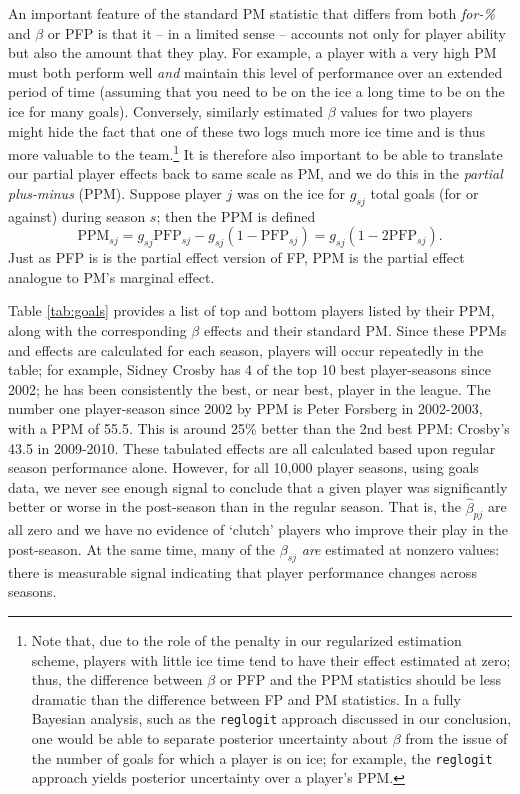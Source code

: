 An important feature of the standard PM statistic that differs from both
\textit{for-\%} and $\beta$ or PFP is that it -- in a limited sense -- accounts
not only for player ability but also the amount that they play.  For example,
a player with a very high PM must both perform well \textit{and} maintain this
level of performance over an extended period of time (assuming that you need
to be on the ice a long time to be on the ice for many goals).  Conversely,
similarly estimated $\beta$ values for two players might hide the fact that one
of these two logs much more ice time and is thus more valuable to the
team.\footnote{Note that, due to the role of the penalty in our regularized
estimation scheme,  players with little ice time tend to have their effect
estimated at zero; thus, the difference between $\beta$ or PFP and the PPM
statistics should be less dramatic than the difference between FP and PM
statistics. In a fully Bayesian analysis, such as the {\tt reglogit} approach
discussed in our conclusion, one would be able to separate posterior
uncertainty about $\beta$ from the issue of the number of goals for which a
player is on ice; for example, the {\tt reglogit} approach yields posterior
uncertainty over a player's PPM.}  It is therefore also important to be able to
translate our partial player effects back to same scale as PM, and we do this
in the {\em partial plus-minus} (PPM). Suppose player $j$ was on the ice for
$g_{sj}$ total goals (for or against) during season $s$; then the PPM is
defined \begin{equation}\label{eq:ppm}  \text{PPM}_{sj} =
g_{sj}\text{PFP}_{sj} - g_{sj}(1-\text{PFP}_{sj}) = g_{sj}(1 -
2\text{PFP}_{sj}).  \end{equation}   Just as PFP is is the partial effect
version of FP, PPM is the partial effect analogue to PM's marginal effect.

Table \ref{tab:goals} provides a list of top and bottom players listed by
their PPM, along with the corresponding $\beta$ effects and their standard PM.
Since these PPMs and effects are calculated for each season, players will
occur repeatedly in the table; for example, Sidney Crosby has 4 of the top 10
best player-seasons since 2002; he has been consistently the best, or near
best, player in the league.  The number one player-season since 2002 by PPM is
Peter Forsberg in 2002-2003, with a PPM of 55.5.  This is around 25\% better
than the 2nd best PPM: Crosby's 43.5 in 2009-2010.  These tabulated effects
are all calculated based upon regular season performance alone.  However,
 for all 10,000 player seasons, using goals data, we never see
enough signal to conclude that a given player was significantly better or
worse in the post-season than in the regular season.  That is, the $\hat
\beta_{pj}$ are all zero and we have no evidence of `clutch' players who
improve their play in the post-season.  At the same time, many of the
$\beta_{sj}$ {\it are} estimated at nonzero values: there is measurable signal
indicating that player performance changes across seasons.

